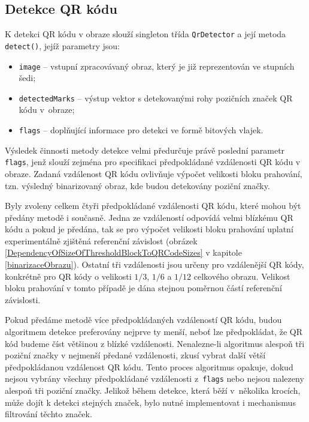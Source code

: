 \subsection{Detekce QR kódu}
\label{detekceQrKoduBarcodesLibr}

K detekci QR kódu v obraze slouží singleton třída \texttt{QrDetector} a její
metoda \texttt{detect()}, jejíž parametry jsou:

\begin{itemize}
  \item \texttt{image} -- vstupní zpracovávaný obraz, který je již reprezentován
  ve stupních šedi;
  \item \texttt{detectedMarks} -- výstup vektor s detekovanými rohy pozičních
  značek QR kódu v~obraze;
  \item \texttt{flags} -- doplňující informace pro detekci ve formě bitových
  vlajek.
\end{itemize}

Výsledek činnosti metody detekce velmi předurčuje právě poslední parametr
\texttt{flags}, jenž slouží zejména pro specifikaci předpokládané vzdálenosti QR
kódu v obraze. Zadaná vzdálenost QR kódu ovlivňuje výpočet velikosti bloku
prahování, tzn. výsledný binarizovaný obraz, kde budou detekovány poziční značky.

Byly zvoleny celkem čtyři předpokládané vzdálenosti QR kódu, které mohou být
předány metodě i současně. Jedna ze vzdáleností odpovídá velmi blízkému QR kódu
a pokud je předána, tak se pro výpočet velikosti bloku prahování uplatní
experimentálně zjištěná referenční závislost (obrázek
\ref{DependencyOfSizeOfThresholdBlockToQRCodeSizes} v kapitole \ref{binarizaceObrazu}).
Ostatní tři vzdálenosti jsou určeny pro vzdálenější QR kódy, konkrétně pro QR kódy 
o velikosti $1/3$, $1/6$ a $1/12$ celkového obrazu. Velikost bloku prahování v
tomto případě je dána stejnou poměrnou částí referenční závislosti.

Pokud předáme metodě více předpokládaných vzdáleností QR kódu, budou algoritmem
detekce preferovány nejprve ty menší, neboť lze předpokládat, že QR kód budeme
číst většinou z blízké vzdálenosti. Nenalezne-li algoritmus alespoň tři poziční
značky v nejmenší předané vzdálenosti, zkusí vybrat další větší předpokládanou
vzdálenost QR kódu. Tento proces algoritmus opakuje, dokud nejsou vybrány
všechny předpokládané vzdálenosti z~\texttt{flags} nebo nejsou nalezeny alespoň
tři poziční značky. Jelikož během detekce, která běží v~několika krocích, může
dojít k detekci stejných značek, bylo nutné implementovat i mechanismus filtrování
těchto značek.

